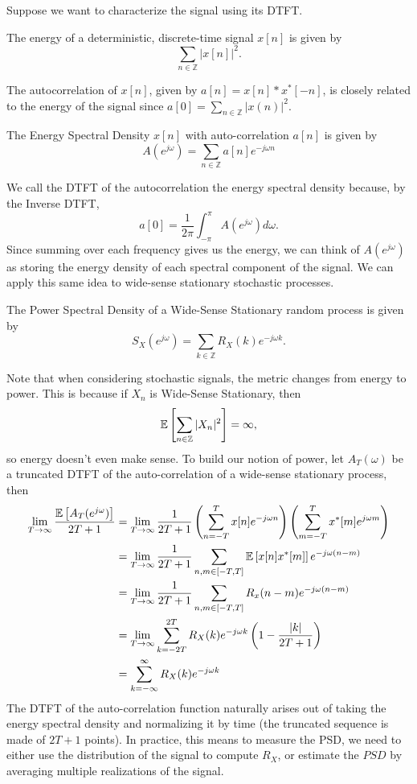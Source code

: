 Suppose we want to characterize the signal using its DTFT.
\begin{definition}
	The energy of a deterministic, discrete-time signal $x[n]$ is given by \[
		\sum_{n\in\mathbb{Z}}|x[n]|^2.
	\]
	\label{defn:energy}
\end{definition}
The autocorrelation of $x[n]$, given by $a[n] = x[n] * x^*[-n]$, is closely related to the energy of the signal since $a[0] = \sum_{n\in\mathbb{Z}}|x(n)|^2$.
\begin{definition}
	The Energy Spectral Density $x[n]$ with auto-correlation $a[n]$ is given by \[
		A(e^{j\omega}) = \sum_{n\in\mathbb{Z}}a[n]e^{-j\omega n}
	\]
	\label{defn:esd}
\end{definition}
We call the DTFT of the autocorrelation the energy spectral density because, by the Inverse DTFT, \[
	a[0] = \frac{1}{2\pi}\int_{-\pi}^{\pi}A(e^{j\omega})d\omega.
\]
Since summing over each frequency gives us the energy, we can think of $A(e^{j\omega})$ as storing the energy density of each spectral component of the signal.
We can apply this same idea to wide-sense stationary stochastic processes.
\begin{definition}
	The Power Spectral Density of a Wide-Sense Stationary random process is given by \[
		S_X(e^{j\omega}) = \sum_{k\in\mathbb{Z}}R_X(k)e^{-j\omega k}.
	\]
	\label{defn:psd}
\end{definition}
Note that when considering stochastic signals, the metric changes from energy to power.
This is because if $X_n$ is Wide-Sense Stationary, then \[
	\mathbb{E}\left[\sum_{n\in\mathbb{Z}}|X_n|^2\right] = \infty,
\]
so energy doesn't even make sense.
To build our notion of power, let $A_T(\omega)$ be a truncated DTFT of the auto-correlation of a wide-sense stationary process, then
\begin{align*}
	\lim_{T\to\infty} \frac{\mathbb{E}\left[A_T(e^{j\omega})\right]}{2T + 1} &= \lim_{T\to\infty}\frac{1}{2T+1}\left(\sum_{n=-T}^Tx[n]e^{-j\omega n}\right)\left(\sum_{m=-T}^Tx^*[m]e^{j\omega m}\right)\\
	&= \lim_{T\to\infty}	\frac{1}{2T+1} \sum_{n,m \in [-T,T]}\mathbb{E}\left[x[n]x^*[m]\right]e^{-j\omega(n-m)}\\
	&= \lim_{T\to\infty}	\frac{1}{2T+1} \sum_{n,m \in [-T,T]}R_x(n-m)e^{-j\omega(n-m)}\\
	&= \lim_{T\to\infty} \sum_{k=-2T}^{2T}R_X(k)e^{-j\omega k}\left(1 - \frac{|k|}{2T+1}\right)\\
	&= \sum_{k=-\infty}^{\infty}R_X(k)e^{-j\omega k}
\end{align*}
The DTFT of the auto-correlation function naturally arises out of taking the energy spectral density and normalizing it by time (the truncated sequence is made of $2T+1$ points).
In practice, this means to measure the PSD, we need to either use the distribution of the signal to compute $R_X$, or estimate the $PSD$ by averaging multiple realizations of the signal.

